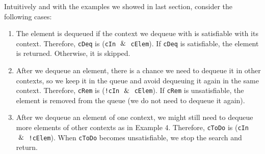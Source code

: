 Intuitively and with the examples we showed in last section, consider the following cases:

\begin{enumerate}

\item The element is dequeued if the context we dequeue with is satisfiable with its context. Therefore, \texttt{cDeq} is (\texttt{cIn} $\And$ \texttt{cElem}). If \texttt{cDeq} is satisfiable, the element is returned. Otherwise, it is skipped. 
\item  After we dequeue an element, there is a chance we need to dequeue it in other contexts, so we keep it in the queue and avoid dequeuing it again in the same context. Therefore, \texttt{cRem} is (\texttt{!cIn} $\And$ \texttt{cElem}). If \texttt{cRem} is unsatisfiable, the element is removed from the queue (we do not need to dequeue it again).

\item  After we dequeue an element of one context, we might still need to dequeue more elements of other contexts as in Example 4. Therefore, \texttt{cToDo} is (\texttt{cIn} $\And$ \texttt{!cElem}). When \texttt{cToDo} becomes unsatisfiable, we stop the search and return. 

\end{enumerate}

